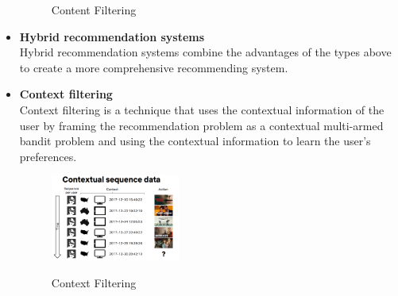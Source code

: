 \begin{itemize}
\begin{figure}[H]
        \caption{Content Filtering}
        \label{fig:content-filtering}
        \cite{NvidiaRecSys}
    \end{figure}
    \item \textbf{Hybrid recommendation systems}\\Hybrid recommendation systems combine the advantages of the types above to create a more comprehensive recommending system.
    \item \textbf{Context filtering}\\Context filtering is a technique that uses the contextual information of the user by framing the recommendation problem as a contextual multi-armed bandit problem and using the contextual information to learn the user's preferences.
    \begin{figure}[H]
        \centering
        \includegraphics[width=0.4\textwidth]{assets/contextual-sequence-prediction.png}
        \caption{Context Filtering}
        \label{fig:costextual-filtering}
        \cite{NvidiaRecSys}
    \end{figure}
\end{itemize}

